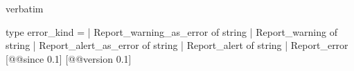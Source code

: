 \begin{camlexample}{verbatim}
\begin{caml}
\begin{camlinput}
type error_kind =
  | Report_warning_as_error of string
  | Report_warning of string
  | Report_alert_as_error of string
  | Report_alert of string
  | Report_error
[@@since 0.1] [@@version 0.1]
\end{camlinput}
\end{caml}
\end{camlexample}
